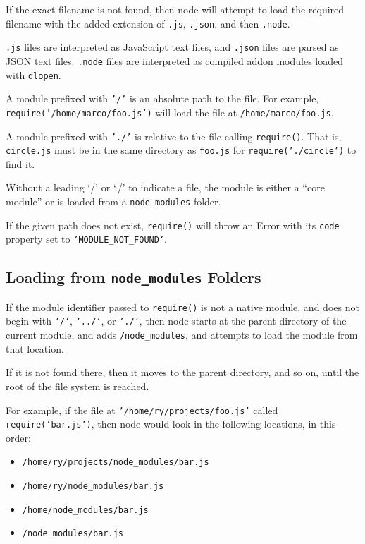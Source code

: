 If the exact filename is not found, then node will attempt to load the
required filename with the added extension of \texttt{.js},
\texttt{.json}, and then \texttt{.node}.

\texttt{.js} files are interpreted as JavaScript text files, and
\texttt{.json} files are parsed as JSON text files. \texttt{.node} files
are interpreted as compiled addon modules loaded with \texttt{dlopen}.

A module prefixed with \texttt{'/'} is an absolute path to the file. For
example, \texttt{require('/home/marco/foo.js')} will load the file at
\texttt{/home/marco/foo.js}.

A module prefixed with \texttt{'./'} is relative to the file calling
\texttt{require()}. That is, \texttt{circle.js} must be in the same
directory as \texttt{foo.js} for \texttt{require('./circle')} to find
it.

Without a leading `/' or `./' to indicate a file, the module is either a
``core module'' or is loaded from a \texttt{node\_modules} folder.

If the given path does not exist, \texttt{require()} will throw an Error
with its \texttt{code} property set to \texttt{'MODULE\_NOT\_FOUND'}.

\subsection{Loading from \texttt{node\_modules}
Folders}\label{loading-from-nodeux5fmodules-folders}

If the module identifier passed to \texttt{require()} is not a native
module, and does not begin with \texttt{'/'}, \texttt{'../'}, or
\texttt{'./'}, then node starts at the parent directory of the current
module, and adds \texttt{/node\_modules}, and attempts to load the
module from that location.

If it is not found there, then it moves to the parent directory, and so
on, until the root of the file system is reached.

For example, if the file at \texttt{'/home/ry/projects/foo.js'} called
\texttt{require('bar.js')}, then node would look in the following
locations, in this order:

\begin{itemize}
\itemsep1pt\parskip0pt
\item
  \texttt{/home/ry/projects/node\_modules/bar.js}
\item
  \texttt{/home/ry/node\_modules/bar.js}
\item
  \texttt{/home/node\_modules/bar.js}
\item
  \texttt{/node\_modules/bar.js}
\end{itemize}

